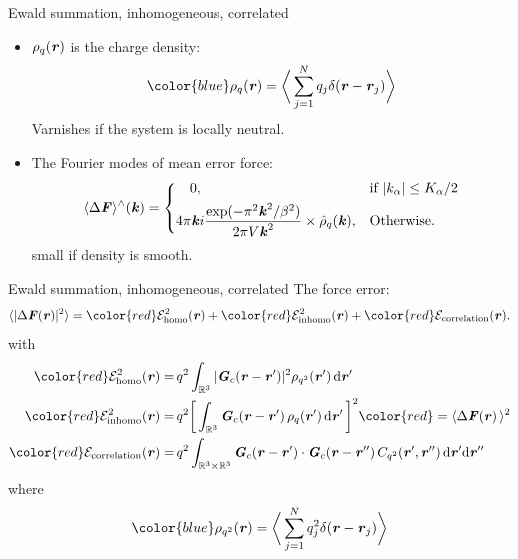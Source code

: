 \documentclass{beamer}
\newcommand{\redc}[1]{{\color{red} #1}}
\newcommand{\bluec}[1]{{\color{blue} #1}}
\renewcommand{\v}[1]{\textbf{\textit{#1}}}
\renewcommand{\d}[1]{\textrm{#1}}
\begin{document}
\begin{frame}{Ewald summation, inhomogeneous, correlated}
  \begin{itemize}\itemsep 15pt
  \item<1-> \bluec{$\rho_q(\v r)$} is the charge density:
    \begin{align*}
      \bluec{  \rho_q(\v r) = 
        \bigg\langle
        \sum_{j = 1}^N
        q_j\delta(\v r - \v r_j)
        \bigg\rangle
      }
    \end{align*}
    Varnishes if the system is \redc{locally} neutral.
  \item<2-> The Fourier modes of mean error force:
    \bluec{
      \begin{align*}
        \langle\Delta\v F\rangle^\wedge(\v k) =
        \left\{
          \begin{aligned}[c]
            & \quad 0, & & \textrm{if}\ \vert k_\alpha\vert\leq K_\alpha/2 \\
            & 4\pi\v ki\frac{\exp(-\pi^2 \v k^2 / \beta^2)}{2\pi V \v k^2}\times\hat\rho_q(\v k),
            & & \textrm{Otherwise}.
          \end{aligned}
        \right.
      \end{align*}}
    small if density is \redc{smooth}.
  \end{itemize}
\end{frame}



\begin{frame}{Ewald summation, inhomogeneous, correlated}
  The force error:
    \bluec{
    \begin{align*} \nonumber
      \langle\vert\Delta\v F(\v r)\vert^2\rangle
      = 
      \redc{\mathcal E^2_{\textrm{homo}}(\v r)} +
      \redc{\mathcal E^2_{\textrm{inhomo}}(\v r)} +
      \redc{\mathcal E_{\textrm{correlation}}(\v r)}.
    \end{align*}
  }
  with\bluec{
    \begin{align*}
      \redc{\mathcal E^2_{\textrm{homo}}(\v r)}
      = &\,
      q^2\int_{\mathbb R^3}\vert\v G_c(\v r - \v r')\vert^2\rho_{q^2}(\v r')\,\d d\v r'  \\
      \redc{\mathcal E^2_{\textrm{inhomo}}(\v r)}
      = &\,
      q^2 \bigg[\int_{\mathbb R^3}\v G_c(\v r - \v r')\,\rho_q(\v r')\,\d d\v r'\,\bigg]^2
      \redc{ = \langle\Delta\v F(\v r)\,\rangle^2}\\
          \redc{\mathcal E_{\textrm{correlation}}(\v r)}
    =&\,
    q^2\int_{\mathbb R^3\times\mathbb R^3}\v G_c(\v r - \v r')\cdot\v G_c(\v r - \v r'')\,C_{q^2}(\v r', \v r'')\,\d d\v r'\d d\v r''
    \end{align*}}
  where
    \begin{align*}
      \bluec{  \rho_{q^2}(\v r) = 
        \bigg\langle
        \sum_{j = 1}^N
        q^2_j\delta(\v r - \v r_j)
        \bigg\rangle
      }
    \end{align*}
\end{frame}
\end{document}
